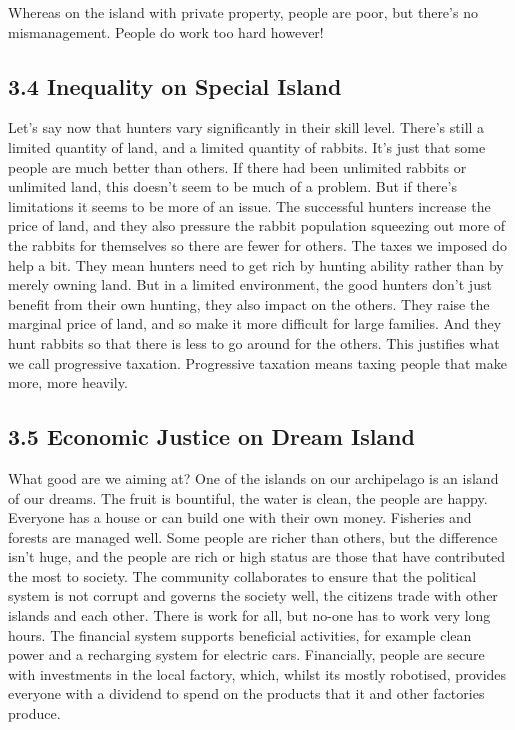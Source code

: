 \documentclass[]{tufte-handout}
\begin{document}
Whereas on the island with private property, people are poor, but
there's no mismanagement. People do work too hard however!

\hypertarget{inequality-on-special-island}{%
\subsection{3.4 Inequality on Special
Island}\label{inequality-on-special-island}}

Let's say now that hunters vary significantly in their skill level.
There's still a limited quantity of land, and a limited quantity of
rabbits. It's just that some people are much better than others. If
there had been unlimited rabbits or unlimited land, this doesn't seem to
be much of a problem. But if there's limitations it seems to be more of
an issue. The successful hunters increase the price of land, and they
also pressure the rabbit population squeezing out more of the rabbits
for themselves so there are fewer for others. The taxes we imposed do
help a bit. They mean hunters need to get rich by hunting ability rather
than by merely owning land. But in a limited environment, the good
hunters don't just benefit from their own hunting, they also impact on
the others. They raise the marginal price of land, and so make it more
difficult for large families. And they hunt rabbits so that there is
less to go around for the others. This justifies what we call
progressive taxation. Progressive taxation means taxing people that make
more, more heavily.

\hypertarget{economic-justice-on-dream-island}{%
\subsection{3.5 Economic Justice on Dream
Island}\label{economic-justice-on-dream-island}}

What good are we aiming at? One of the islands on our archipelago is an
island of our dreams. The fruit is bountiful, the water is clean, the
people are happy. Everyone has a house or can build one with their own
money. Fisheries and forests are managed well. Some people are richer
than others, but the difference isn't huge, and the people are rich or
high status are those that have contributed the most to society. The
community collaborates to ensure that the political system is not
corrupt and governs the society well, the citizens trade with other
islands and each other. There is work for all, but no-one has to work
very long hours. The financial system supports beneficial activities,
for example clean power and a recharging system for electric cars.
Financially, people are secure with investments in the local factory,
which, whilst its mostly robotised, provides everyone with a dividend to
spend on the products that it and other factories produce.
\end{document}
